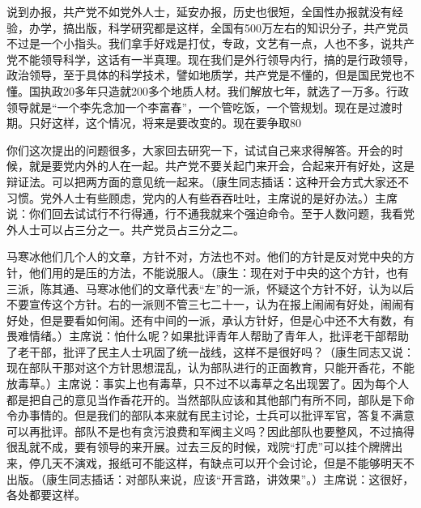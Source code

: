 说到办报，共产党不如党外人士，延安办报，历史也很短，全国性办报就没有经验，办学，搞出版，科学研究都是这样，全国有500万左右的知识分子，共产党员不过是一个小指头。我们拿手好戏是打仗，专政，文艺有一点，人也不多，说共产党不能领导科学，这话有一半真理。现在我们是外行领导内行，搞的是行政领导，政治领导，至于具体的科学技术，譬如地质学，共产党是不懂的，但是国民党也不懂。国执政20多年只造就200多个地质人材。我们解放七年，就选了一万多。行政领导就是“一个李先念加一个李富春”，一个管吃饭，一个管规划。现在是过渡时期。只好这样，这个情况，将来是要改变的。现在要争取80%

你们这次提出的问题很多，大家回去研究一下，试试自己来求得解答。开会的时候，就是要党内外的人在一起。共产党不要关起门来开会，合起来开有好处，这是辩证法。可以把两方面的意见统一起来。（康生同志插话：这种开会方式大家还不习惯。党外人士有些顾虑，党内的人有些吞吞吐吐，主席说的是好办法。）主席说：你们回去试试行不行得通，行不通我就来个强迫命令。至于人数问题，我看党外人士可以占三分之一。共产党员占三分之二。

马寒冰他们几个人的文章，方针不对，方法也不对。他们的方针是反对党中央的方针，他们用的是压的方法，不能说服人。（康生：现在对于中央的这个方针，也有三派，陈其通、马寒冰他们的文章代表“左”的一派，怀疑这个方针不好，认为以后不要宣传这个方针。右的一派则不管三七二十一，认为在报上闹闹有好处，闹闹有好处，但是要看如何闹。还有中间的一派，承认方针好，但是心中还不大有数，有畏难情绪。）主席说：怕什么呢？如果批评青年人帮助了青年人，批评老干部帮助了老干部，批评了民主人士巩固了统一战线，这样不是很好吗？（康生同志又说：现在部队干那对这个方针思想混乱，认为部队进行的正面教育，只能开香花，不能放毒草。）主席说：事实上也有毒草，只不过不以毒草之名出现罢了。因为每个人都是把自己的意见当作香花开的。当然部队应该和其他部门有所不同，部队是下命令办事情的。但是我们的部队本来就有民主讨论，士兵可以批评军官，答复不满意可以再批评。部队不是也有贪污浪费和军阀主义吗？因此部队也要整风，不过搞得很乱就不成，要有领导的来开展。过去三反的时候，戏院“打虎”可以挂个牌牌出来，停几天不演戏，报纸可不能这样，有缺点可以开个会讨论，但是不能够明天不出版。（康生同志插话：对部队来说，应该“开言路，讲效果”。）主席说：这很好，各处都要这样。

